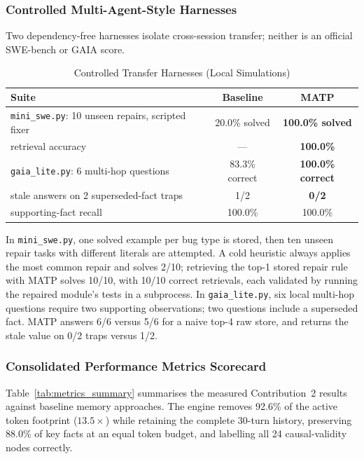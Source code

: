 \documentclass[lettersize,journal]{IEEEtran}
\begin{document}
\subsubsection{Controlled Multi-Agent-Style Harnesses}
Two dependency-free harnesses isolate cross-session transfer; neither is an official SWE-bench or GAIA score.

\begin{table}[!t]
\caption{Controlled Transfer Harnesses (Local Simulations)\label{tab:transfer}}
\centering
{\small
\begin{tabular}{lcc}
\toprule
\textbf{Suite} & \textbf{Baseline} & \textbf{MATP} \\
\midrule
\texttt{mini\_swe.py}: 10 unseen repairs, scripted fixer & 20.0\% solved & \textbf{100.0\% solved} \\
\quad retrieval accuracy & --- & \textbf{100.0\%} \\
\texttt{gaia\_lite.py}: 6 multi-hop questions & 83.3\% correct & \textbf{100.0\% correct} \\
\quad stale answers on 2 superseded-fact traps & 1/2 & \textbf{0/2} \\
\quad supporting-fact recall & 100.0\% & 100.0\% \\
\bottomrule
\end{tabular}
}
\end{table}

In \texttt{mini\_swe.py}, one solved example per bug type is stored, then ten unseen repair tasks with different literals are attempted. A cold heuristic always applies the most common repair and solves 2/10; retrieving the top-1 stored repair rule with MATP solves 10/10, with 10/10 correct retrievals, each validated by running the repaired module's tests in a subprocess. In \texttt{gaia\_lite.py}, six local multi-hop questions require two supporting observations; two questions include a superseded fact. MATP answers 6/6 versus 5/6 for a naive top-4 raw store, and returns the stale value on 0/2 traps versus 1/2.

\subsubsection{Consolidated Performance Metrics Scorecard}
Table~\ref{tab:metrics_summary} summarises the measured Contribution~2 results against baseline memory approaches. The engine removes 92.6\% of the active token footprint ($13.5\times$) while retaining the complete 30-turn history, preserving 88.0\% of key facts at an equal token budget, and labelling all 24 causal-validity nodes correctly.
\end{document}
